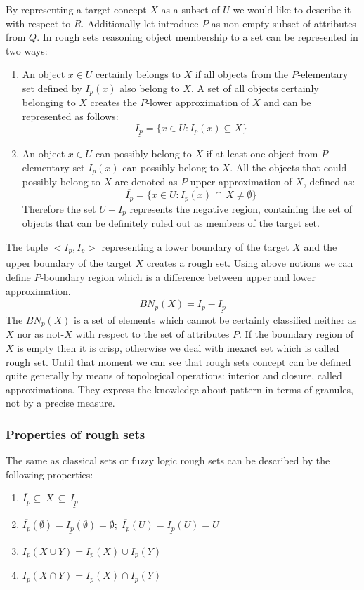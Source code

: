 By representing a target concept $X$ as a subset of $U$ we would like to
describe it with respect to $R$. Additionally let introduce $P$ as non-empty
subset of attributes from $Q$. In rough sets reasoning object membership to a
set can be represented in two ways:
\begin{enumerate}
    \item An object $x \in U$ certainly belongs to $X$ if
        all objects from the $P$-elementary set defined by $I_p(x)$ also belong to $X$.
        A set of all objects certainly belonging to $X$ creates the $P$-lower
        approximation of $X$ and can be represented as follows:
            $$\underline{I_p} = \{ x \in U: I_p(x) \subseteq X\}$$
    \item An object $x \in U$ can possibly belong to $X$ if at least one object
        from $P$-elementary set $I_p(x)$ can possibly belong to $X$. All the
        objects that could possibly belong to $X$ are denoted as $P$-upper
        approximation of $X$, defined as:
        $$\overline{I_p} = \{x\in U: I_p(x) \, \cap \, X \neq \emptyset \}$$
        Therefore the set $U - \overline{I_p}$ represents the negative region,
        containing the set of objects that can be definitely ruled out as
        members of the target set.
\end{enumerate}
The tuple $<\underline{I_p}, \overline{I_p}>$ representing a lower boundary of
the target $X$ and the upper boundary of the target $X$ creates a rough set.
Using above notions we can define $P$-boundary region which is a difference
between upper and lower approximation. 
$$BN_p(X) = \overline{I_p} - \underline{I_p}$$
The $BN_p(X)$ is a set of elements which cannot be certainly classified neither
as $X$ nor as not-$X$ with respect to the set of attributes $P$. If the
boundary region of $X$ is empty then it is crisp, otherwise we deal with
inexact set which is called rough set. Until that moment we can see that 
rough sets concept can be defined quite generally by means of topological
operations: interior and closure, called approximations. They express the
knowledge about pattern in terms of granules, not by a precise measure.

\subsubsection{Properties of rough sets}
The same as classical sets or fuzzy logic rough sets can be described by the
following properties:
\begin{enumerate}
    \item $\overline{I_p} \subseteq \, X \, \subseteq \, \underline{I_p}$
    \item $\overline{I_p}(\emptyset) = \underline{I_p}(\emptyset) = \emptyset;
        \;
        \overline{I_p}(U) = \underline{I_p}(U) = U $
    \item $\overline{I_p}(X \cup Y) = \overline{I_p}(X) \cup \overline{I_p}(Y)$
    \item $\underline{I_p}(X \cap Y) = \underline{I_p}(X) \cap \underline{I_p}(Y)$
\end{enumerate}

